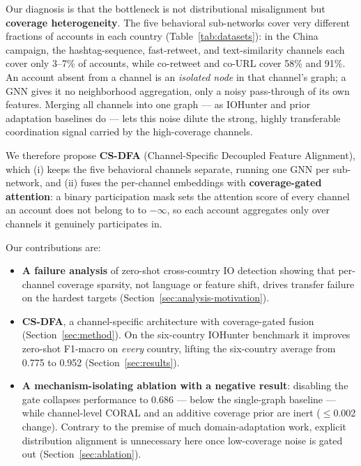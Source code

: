 \documentclass[conference]{IEEEtran}
\newcommand{\method}{CS-DFA}
\begin{document}
Our diagnosis is that the bottleneck is not distributional misalignment but
\textbf{coverage heterogeneity}. The five behavioral sub-networks cover very
different fractions of accounts in each country
(Table~\ref{tab:datasets}): in the China campaign, the hashtag-sequence,
fast-retweet, and text-similarity channels each cover only 3--7\% of
accounts, while co-retweet and co-URL cover 58\% and 91\%. An account absent
from a channel is an \emph{isolated node} in that channel's graph; a GNN
gives it no neighborhood aggregation, only a noisy pass-through of its own
features. Merging all channels into one graph --- as IOHunter and prior
adaptation baselines do --- lets this noise dilute the strong, highly
transferable coordination signal carried by the high-coverage channels.

We therefore propose \textbf{\method{}} (Channel-Specific Decoupled Feature
Alignment), which (i) keeps the five behavioral channels separate, running
one GNN per sub-network, and (ii) fuses the per-channel embeddings with
\textbf{coverage-gated attention}: a binary participation mask sets the
attention score of every channel an account does not belong to
to $-\infty$, so each account aggregates only over channels it genuinely
participates in.

Our contributions are:
\begin{itemize}
  \item \textbf{A failure analysis} of zero-shot cross-country IO detection
    showing that per-channel coverage sparsity, not language or feature
    shift, drives transfer failure on the hardest targets
    (Section~\ref{sec:analysis-motivation}).
  \item \textbf{\method{}}, a channel-specific architecture with
    coverage-gated fusion (Section~\ref{sec:method}). On the six-country
    IOHunter benchmark it improves zero-shot F1-macro on \emph{every}
    country, lifting the six-country average from 0.775 to 0.952
    (Section~\ref{sec:results}).
  \item \textbf{A mechanism-isolating ablation with a negative result}:
    disabling the gate collapses performance to 0.686 --- below the
    single-graph baseline --- while channel-level CORAL and an additive
    coverage prior are inert ($\le$0.002 change). Contrary to the premise of
    much domain-adaptation work, explicit distribution alignment is
    unnecessary here once low-coverage noise is gated out
    (Section~\ref{sec:ablation}).
\end{itemize}
\end{document}
